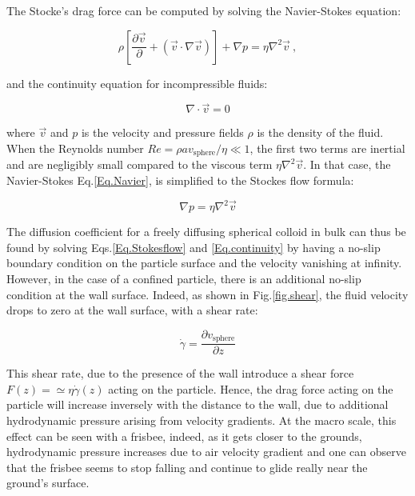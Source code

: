 The Stocke's drag force can be computed by solving the Navier-Stokes equation:

\begin{equation}
	\rho \left[ \frac{\partial \vec{v}}{\partial} + \left(\vec{v} \cdot \nabla \vec{v} \right) \right] + \nabla p = \eta \nabla ^2 \vec{v} ~,
	\label{Eq.Navier}
\end{equation}

and the continuity equation for incompressible fluids:

\begin{equation}
	\nabla \cdot \vec{v} = 0
	\label{Eq.continuity}
\end{equation}

where $\vec{v}$ and $p$ is the velocity and pressure fields $\rho$ is the density of the fluid. When the Reynolds number $Re = \rho a v_\mathrm{sphere} / \eta \ll 1$,  the first two terms are inertial and are negligibly small compared to the viscous term $\eta \nabla ^2 \vec{v}$. In that case, the Navier-Stokes Eq.\ref{Eq.Navier}, is simplified to the Stockes flow formula:

\begin{equation}
	\nabla p = \eta \nabla ^2 \vec{v}
	\label{Eq.Stokesflow}
\end{equation}

The diffusion coefficient for a freely diffusing spherical colloid in bulk can thus be found by solving Eqs.\ref{Eq.Stokesflow} and \ref{Eq.continuity} by having a no-slip boundary condition on the particle surface and the velocity vanishing at infinity. However, in the case of a confined particle, there is an additional no-slip condition at the wall surface. Indeed, as shown in Fig.\ref{fig.shear}, the fluid velocity drops to zero at the wall surface, with a shear rate:

\begin{equation}
	\dot{\gamma} = \frac{\partial v_\mathrm{sphere}}{\partial z}
\end{equation} 

This shear rate, due to the presence of the wall introduce a shear force $F(z) = \simeq \eta \dot{\gamma} (z) $ acting on the particle. Hence, the drag force acting on the particle will increase inversely with the distance to the wall, due to additional hydrodynamic pressure arising from velocity gradients. At the macro scale, this effect can be seen with a frisbee, indeed, as it gets closer to the grounds, hydrodynamic pressure increases due to air velocity gradient and one can observe that the frisbee seems to stop falling and continue to glide really near the ground's surface.


